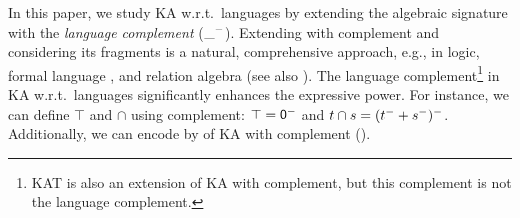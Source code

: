 In this paper, we study KA w.r.t.\ languages  by extending the algebraic signature with the \emph{language complement} ($\_^{-}$).
Extending with complement and considering its fragments is a natural, comprehensive approach,
e.g., in logic, formal language \cite{cohenDotdepthStarfreeEvents1971,pinDotDepthHierarchy452016}, and relation algebra \cite{tarskiCalculusRelations1941,ngRelationAlgebrasTransitive1984}
(see also \cite{andrekaEquationalTheoryUnionfree1995,brunetPetriAutomataKleene2015,nakamuraPartialDerivativesGraphs2017,pousPositiveCalculusRelations2018,nakamuraExistentialCalculiRelations2023}).
The language complement\footnote{KAT \cite{kozenKleeneAlgebraTests1996} is also an extension of KA with complement, but this complement is not the language complement.} in KA w.r.t.\ languages significantly enhances the expressive power.
For instance, we can define $\top$ and $\cap$ using complement: $\top = \mathsf{0}^{-}$ and $\term[1] \cap \term[2] = (\term[1]^{-} \union \term[2]^{-})^{-}$.
Additionally, we can encode  by  of KA  with complement ().

